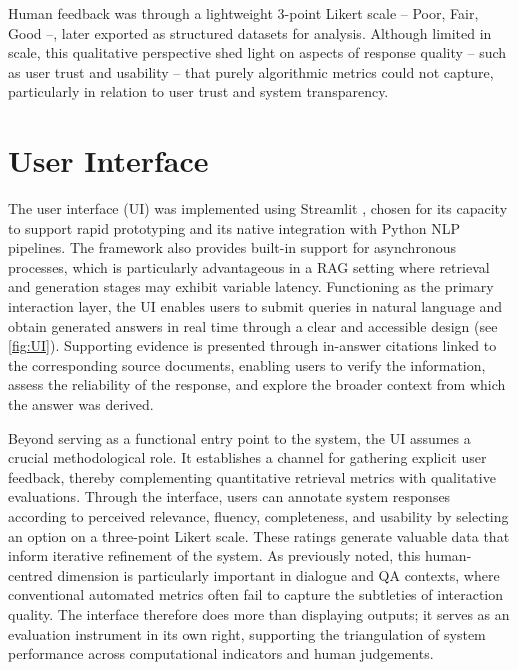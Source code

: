 \begin{spacing}{1.5}
Human feedback was through a lightweight 3-point Likert scale -- Poor, Fair, Good --, later exported as structured datasets for analysis. Although limited in scale, this qualitative perspective shed light on aspects of response quality -- such as user trust and usability -- that purely algorithmic metrics could not capture, particularly in relation to user trust and system transparency.


\section{User Interface}
The user interface (UI) was implemented using Streamlit \citep{noauthor_streamlit_2025}, chosen for its capacity to support rapid prototyping and its native integration with Python NLP pipelines. The framework also provides built-in support for asynchronous processes, which is particularly advantageous in a RAG setting where retrieval and generation stages may exhibit variable latency. Functioning as the primary interaction layer, the UI enables users to submit queries in natural language and obtain generated answers in real time through a clear and accessible design (see \autoref{fig:UI}). Supporting evidence is presented through in-answer citations linked to the corresponding source documents, enabling users to verify the information, assess the reliability of the response, and explore the broader context from which the answer was derived.

Beyond serving as a functional entry point to the system, the UI assumes a crucial methodological role. It establishes a channel for gathering explicit user feedback, thereby complementing quantitative retrieval metrics with qualitative evaluations. Through the interface, users can annotate system responses according to perceived relevance, fluency, completeness, and usability by selecting an option on a three-point Likert scale. These ratings generate valuable data that inform iterative refinement of the system. As previously noted, this human-centred dimension is particularly important in dialogue and QA contexts, where conventional automated metrics often fail to capture the subtleties of interaction quality. The interface therefore does more than displaying outputs; it serves as an evaluation instrument in its own right, supporting the triangulation of system performance across computational indicators and human judgements.


\end{spacing}
